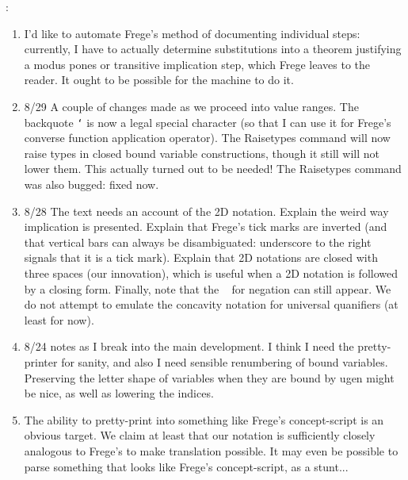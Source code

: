 \documentclass{article}
\begin{document}
\begin{description}

\item[ wish list of possible additions:]

\item:
\begin{enumerate}

\item I'd like to automate Frege's method  of documenting individual steps:  currently, I have to actually determine substitutions into a theorem justifying a modus pones or transitive implication step, which Frege leaves to the reader.  It ought to be possible for the machine to do it.

\item 8/29  A couple of changes made as we proceed into value ranges.  The backquote {\tt `} is now a legal special character
(so that I can use it for Frege's converse function application operator).  The Raisetypes command will now raise types in closed
bound variable constructions, though it still will not lower them.  This actually turned out to be needed!  The Raisetypes command was also
bugged:  fixed now.

\item 8/28  The text needs an account of the 2D notation.  Explain the weird way implication is presented.  Explain that Frege's tick marks are inverted
(and that vertical bars can always be disambiguated:  underscore to the right signals that it is a tick mark).  Explain that 2D notations are closed
with three spaces (our innovation), which is useful when a 2D notation is followed by a closing form.  Finally, note that the ~ for negation can still appear.  We do not attempt to emulate the concavity notation for universal quanifiers (at least for now).

\item 8/24 notes as I break into the main development.  I think I need the pretty-printer for sanity, and also I need sensible renumbering of bound variables.   Preserving the letter shape
of variables when they are bound by ugen might be nice, as well as lowering the indices.

\item  The ability to pretty-print into something like Frege's concept-script is an obvious target.  We claim at least that our notation is sufficiently closely analogous to Frege's to make translation possible.  It may even be possible to parse something that looks like Frege's concept-script, as a stunt...


\end{enumerate}
\end{description}
\end{document}
